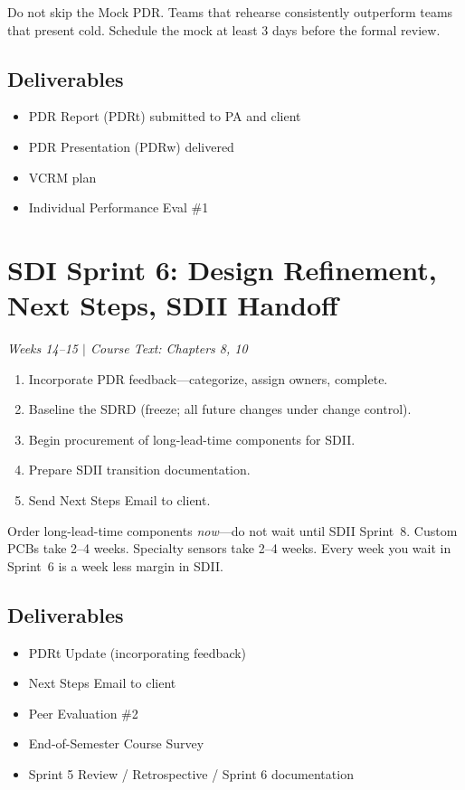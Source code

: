\documentclass[11pt,letterpaper]{article}
\begin{document}
\begin{warnbox}
Do not skip the Mock PDR. Teams that rehearse consistently outperform teams that present cold. Schedule the mock at least 3 days before the formal review.
\end{warnbox}

\subsection{Deliverables}
\begin{itemize}[nosep,leftmargin=1.5em]
\item PDR Report (PDRt) submitted to PA and client
\item PDR Presentation (PDRw) delivered
\item VCRM plan
\item Individual Performance Eval \#1
\end{itemize}


\section{SDI Sprint 6: Design Refinement, Next Steps, SDII Handoff}
\textit{Weeks 14--15 $|$ Course Text: Chapters 8, 10}

\begin{priorities}
\begin{enumerate}[nosep]
\item Incorporate PDR feedback---categorize, assign owners, complete.
\item Baseline the SDRD (freeze; all future changes under change control).
\item Begin procurement of long-lead-time components for SDII.
\item Prepare SDII transition documentation.
\item Send Next Steps Email to client.
\end{enumerate}
\end{priorities}

\begin{protip}
Order long-lead-time components \emph{now}---do not wait until SDII Sprint~8. Custom PCBs take 2--4 weeks. Specialty sensors take 2--4 weeks. Every week you wait in Sprint~6 is a week less margin in SDII.
\end{protip}

\subsection{Deliverables}
\begin{itemize}[nosep,leftmargin=1.5em]
\item PDRt Update (incorporating feedback)
\item Next Steps Email to client
\item Peer Evaluation \#2
\item End-of-Semester Course Survey
\item Sprint 5 Review / Retrospective / Sprint 6 documentation
\end{itemize}
\end{document}
